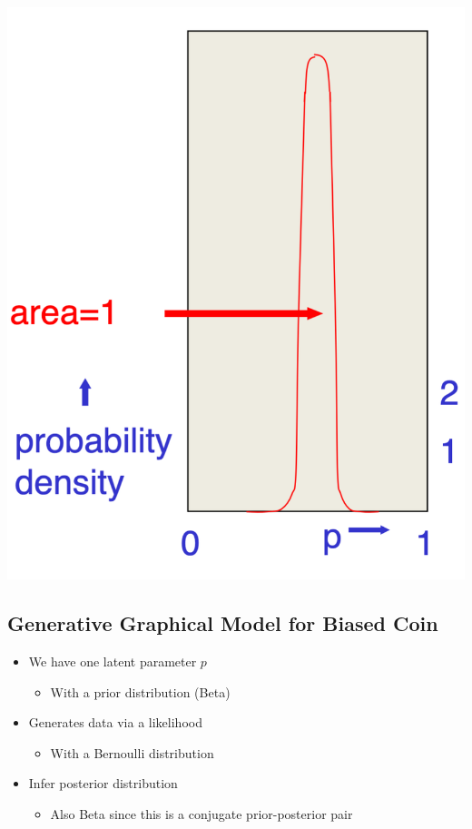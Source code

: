 \documentclass[11pt]{article}
\theoremstyle{definition}
\begin{document}
\includegraphics[width=\textwidth]{8.png}

\subsection{Generative Graphical Model for Biased Coin}

\begin{itemize}
    \item We have one latent parameter \( p \)
    \begin{itemize}
        \item With a prior distribution (Beta)
    \end{itemize}
    \item Generates data via a likelihood
    \begin{itemize}
        \item With a Bernoulli distribution
    \end{itemize}
    \item Infer posterior distribution
    \begin{itemize}
        \item Also Beta since this is a conjugate prior-posterior pair
    \end{itemize}
\end{itemize}
\end{document}
